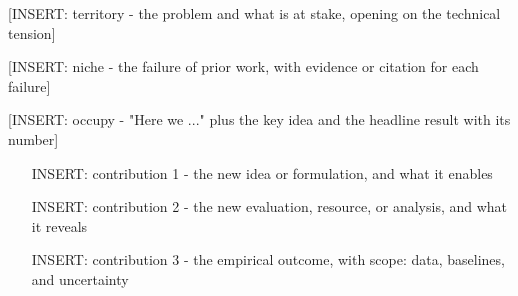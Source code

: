 [INSERT: territory - the problem and what is at stake, opening on the technical tension]

[INSERT: niche - the failure of prior work, with evidence or citation for each failure]

[INSERT: occupy - "Here we ..." plus the key idea and the headline result with its number]

\begin{itemize}
  \item [INSERT: contribution 1 - the new idea or formulation, and what it enables]
  \item [INSERT: contribution 2 - the new evaluation, resource, or analysis, and what it reveals]
  \item [INSERT: contribution 3 - the empirical outcome, with scope: data, baselines, and uncertainty]
\end{itemize}
